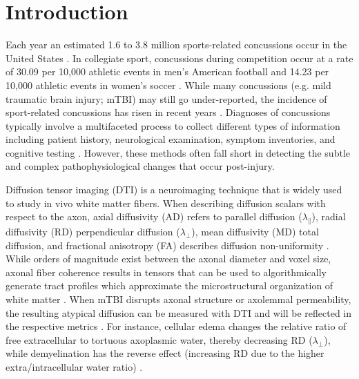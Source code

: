 \documentclass[12pt]{article}
\begin{document}
\section{Introduction}
\label{sec:intro}

Each year an estimated 1.6 to 3.8 million sports-related concussions occur in the United States \autocite{langlois2006EpidemiologyImpactTraumatic,daneshvar2011EpidemiologySportRelatedConcussion,barkhoudarian2016MolecularPathophysiologyConcussive}. In collegiate sport, concussions during competition occur at a rate of 30.09 per 10,000 athletic events in men's American football and 14.23 per 10,000 athletic events in women's soccer \autocite{pierpoint2021EpidemiologySportRelatedConcussion}. While many concussions (e.g. mild traumatic brain injury; mTBI\autocite{mayer2017SpectrumMildTraumatic,silverberg2023AmericanCongressRehabilitation}) may still go under-reported, the incidence of sport-related concussions has risen in recent years \autocite{coronado2015TrendsSportsRecreationRelated,pierpoint2021EpidemiologySportRelatedConcussion, yang2017NewRecurrentConcussions}. Diagnoses of concussions typically involve a multifaceted process to collect different types of information including patient history, neurological examination, symptom inventories, and cognitive testing \autocite{patricios2023ConsensusStatementConcussion}. However, these methods often fall short in detecting the subtle and complex pathophysiological changes that occur post-injury.

Diffusion tensor imaging (DTI) is a neuroimaging technique that is widely used to study in vivo white matter fibers. When describing diffusion scalars with respect to the axon, axial diffusivity (AD) refers to parallel diffusion ($\lambda_\parallel$), radial diffusivity (RD) perpendicular diffusion ($\lambda_\perp$), mean diffusivity (MD) total diffusion, and fractional anisotropy (FA) describes diffusion non-uniformity \autocite{mori1999ThreedimensionalTrackingAxonal,lilja2014VisualizingMeyersLoop,lindsey2023DiffusionWeightedImagingMild}. While orders of magnitude exist between the axonal diameter and voxel size, axonal fiber coherence results in tensors that can be used to algorithmically generate tract profiles which approximate the microstructural organization of white matter \autocite{kiselev2021MicrostructureDiffusionMRI,novikov2019QuantifyingBrainMicrostructure,danielian2010ReliabilityFiberTracking,reid2022TractspecificStatisticsBased,sarwar2019MappingConnectomesDiffusion,tournier2007RobustDeterminationFibre}. When mTBI disrupts axonal structure or axolemmal permeability, the resulting atypical diffusion can be measured with DTI and will be reflected in the respective metrics \autocite{macdonald2007DetectionTraumaticAxonal,macdonald2007DiffusionTensorImaging}. For instance, cellular edema changes the relative ratio of free extracellular to tortuous axoplasmic water, thereby decreasing RD ($\lambda_\perp$), while demyelination has the reverse effect (increasing RD due to the higher extra/intracellular water ratio) \autocite{rosenblum2007CytotoxicEdemaMonitoring,liang2007CytotoxicEdemaMechanisms,borja2018DiffusionMRImaging,barkhoudarian2016MolecularPathophysiologyConcussive,pettus1996CharacterizationDistinctSet}.
\end{document}
